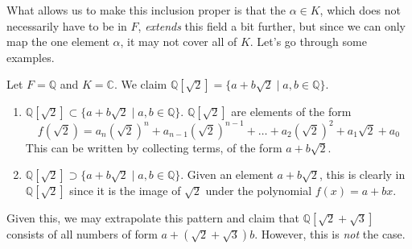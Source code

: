   What allows us to make this inclusion proper is that the $\alpha \in K$, which does not necessarily have to be in $F$, \textit{extends} this field a bit further, but since we can only map the one element $\alpha$, it may not cover all of $K$. Let's go through some examples. 

  \begin{example}
    Let $F = \mathbb{Q}$ and $K = \mathbb{C}$. We claim $\mathbb{Q}[\sqrt{2}] = \{a + b \sqrt{2} \mid a, b \in \mathbb{Q} \}$.
    \begin{enumerate}
      \item $\mathbb{Q}[\sqrt{2}] \subset \{a + b \sqrt{2} \mid a, b \in \mathbb{Q} \}$. $\mathbb{Q}[\sqrt{2}]$ are elements of the form
      \begin{equation}
        f(\sqrt{2}) = a_n (\sqrt{2})^n + a_{n-1} (\sqrt{2})^{n-1} + \ldots + a_2 (\sqrt{2})^2 + a_1 \sqrt{2} + a_0
      \end{equation} 
      This can be written by collecting terms, of the form $a + b \sqrt{2}$. 

      \item $\mathbb{Q}[\sqrt{2}] \supset \{a + b \sqrt{2} \mid a, b \in \mathbb{Q} \}$. Given an element $a + b \sqrt{2}$, this is clearly in $\mathbb{Q}[\sqrt{2}]$ since it is the image of $\sqrt{2}$ under the polynomial $f(x) = a + bx$. 
    \end{enumerate}
  \end{example} 

  Given this, we may extrapolate this pattern and claim that $\mathbb{Q}[\sqrt{2} + \sqrt{3}]$ consists of all numbers of form $a + (\sqrt{2} + \sqrt{3}) b$. However, this is \textit{not} the case. 

